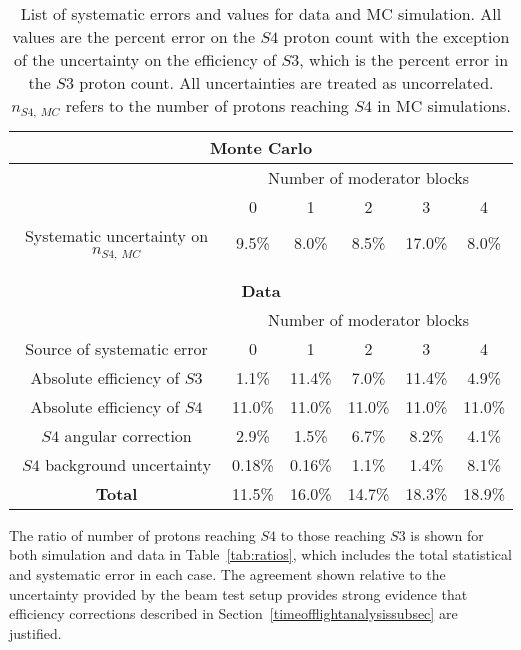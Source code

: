 \begin{table}
  \centering
  \caption{List of systematic errors and values for data and MC simulation. All values are the percent error on the $\mathit{S4}$ proton count with the exception of the uncertainty on the efficiency of $\mathit{S3}$, which is the percent error in the $\mathit{S3}$ proton count. All uncertainties are treated as uncorrelated. $n_{\mathit{S4},~MC}$ refers to the number of protons reaching $\mathit{S4}$ in MC simulations.}
  \begin{tabular}{c|c c c c c}
    \hline
    \hline
    \multicolumn{6}{c}{\textbf{Monte Carlo}} \\
    \hline
    & \multicolumn{5}{c}{Number of moderator blocks} \\
    & 0 & 1 & 2 & 3 & 4 \\
    \hline
    Systematic uncertainty on $n_{\mathit{S4},~MC}$ & 9.5\% & 8.0\% & 8.5\% & 17.0\% & 8.0\% \\
    \hline
    \multicolumn{6}{c}{} \\
    \multicolumn{6}{c}{} \\
    \hline
    \hline
    \multicolumn{6}{c}{\textbf{Data}} \\
    \hline
    & \multicolumn{5}{c}{Number of moderator blocks} \\
    Source of systematic error & 0 & 1 & 2 & 3 & 4 \\
    \hline
    Absolute efficiency of $\mathit{S3}$ & 1.1\% & 11.4\% & 7.0\% & 11.4\% & 4.9\% \\
    Absolute efficiency of $\mathit{S4}$ & 11.0\% & 11.0\% & 11.0\% & 11.0\% & 11.0\% \\ 
    $\mathit{S4}$ angular correction & 2.9\% & 1.5\% & 6.7\% & 8.2\% & 4.1\% \\
    $\mathit{S4}$ background uncertainty & 0.18\% & 0.16\% & 1.1\% & 1.4\% & 8.1\% \\
    \hline
    \textbf{Total} & 11.5\% & 16.0\% & 14.7\% & 18.3\% & 18.9\% \\
    \hline 
  \end{tabular}
  \label{tab:systematics}
\end{table}

The ratio of number of protons reaching $\mathit{S4}$ to those reaching $\mathit{S3}$ is shown for both simulation and data in Table~\ref{tab:ratios}, which includes the total statistical and systematic error in each case.
The agreement shown relative to the uncertainty provided by the beam test setup provides strong evidence that efficiency corrections described in Section~\ref{timeofflightanalysissubsec} are justified.

